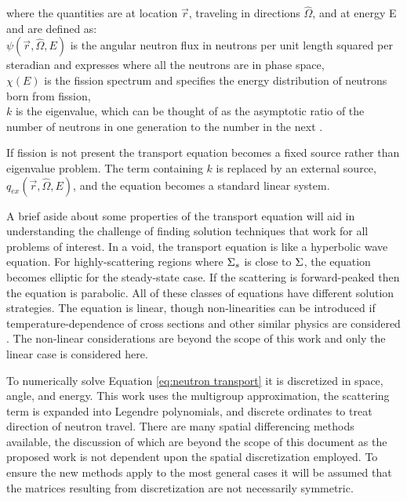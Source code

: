 \noindent where the quantities are at location $\vec{r}$, traveling in directions $\hat{\Omega}$, and at energy E and are defined as: \\
\indent $\psi(\vec{r}, \hat{\Omega}, E)$ is the angular neutron flux in neutrons per unit length squared per steradian and expresses where all the neutrons are in phase space, \\
\indent $\chi(E)$ is the fission spectrum and specifies the energy distribution of neutrons born from fission, \\
\indent $k$ is the eigenvalue, which can be thought of as the asymptotic ratio of the number of neutrons in one generation to the number in the next \cite{Lewis1993}.

If fission is not present the transport equation becomes a fixed source rather than eigenvalue problem. The term containing $k$ is replaced by an external source, $q_{ex}(\vec{r}, \hat{\Omega}, E)$, and the equation becomes a standard linear system. 

A brief aside about some properties of the transport equation will aid in understanding the challenge of finding solution techniques that work for all problems of interest. In a void, the transport equation is like a hyperbolic wave equation. For highly-scattering regions where $\Sigma_{s}$ is close to $\Sigma$, the equation becomes elliptic for the steady-state case. If the scattering is forward-peaked then the equation is parabolic. All of these classes of equations have different solution strategies. The equation is linear, though non-linearities can be introduced if temperature-dependence of cross sections and other similar physics are considered \cite{Adams2002}.  The non-linear considerations are beyond the scope of this work and only the linear case is considered here.

To numerically solve Equation \eqref{eq:neutron transport} it is discretized in space, angle, and energy. This work uses the multigroup approximation, the scattering term is expanded into Legendre polynomials, and discrete ordinates to treat direction of neutron travel. There are many spatial differencing methods available, the discussion of which are beyond the scope of this document as the proposed work is not dependent upon the spatial discretization employed. To ensure the new methods apply to the most general cases it will be assumed that the matrices resulting from discretization are not necessarily symmetric. 

